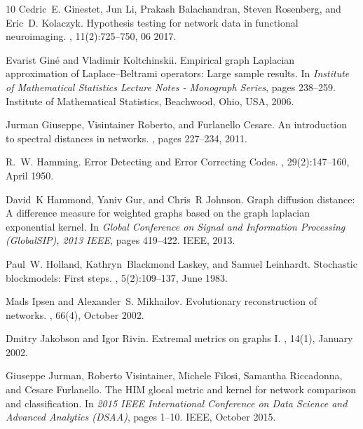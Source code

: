 \documentclass{amsart}
\begin{document}
\begin{thebibliography}{10}
Cedric~E. Ginestet, Jun Li, Prakash Balachandran, Steven Rosenberg, and Eric~D.
  Kolaczyk.
\newblock Hypothesis testing for network data in functional neuroimaging.
, 11(2):725--750, 06 2017.

Evarist Giné and Vladimir Koltchinskii.
\newblock Empirical graph {Laplacian} approximation of {Laplace}–{Beltrami}
  operators: {Large} sample results.
\newblock In {\em Institute of {Mathematical} {Statistics} {Lecture} {Notes} -
  {Monograph} {Series}}, pages 238--259. Institute of Mathematical Statistics,
  Beachwood, Ohio, USA, 2006.

Jurman Giuseppe, Visintainer Roberto, and Furlanello Cesare.
\newblock An introduction to spectral distances in networks.
, pages
  227--234, 2011.

R.~W. Hamming.
\newblock Error {Detecting} and {Error} {Correcting} {Codes}.
, 29(2):147--160, April 1950.

David~K Hammond, Yaniv Gur, and Chris~R Johnson.
\newblock Graph diffusion distance: A difference measure for weighted graphs
  based on the graph laplacian exponential kernel.
\newblock In {\em Global Conference on Signal and Information Processing
  (GlobalSIP), 2013 IEEE}, pages 419--422. IEEE, 2013.

Paul~W. Holland, Kathryn~Blackmond Laskey, and Samuel Leinhardt.
\newblock Stochastic blockmodels: {First} steps.
, 5(2):109--137, June 1983.

Mads Ipsen and Alexander~S. Mikhailov.
\newblock Evolutionary reconstruction of networks.
, 66(4), October 2002.

Dmitry Jakobson and Igor Rivin.
\newblock Extremal metrics on graphs {I}.
, 14(1), January 2002.

Giuseppe Jurman, Roberto Visintainer, Michele Filosi, Samantha Riccadonna, and
  Cesare Furlanello.
\newblock The {HIM} glocal metric and kernel for network comparison and
  classification.
\newblock In {\em 2015 {IEEE} {International} {Conference} on {Data} {Science}
  and {Advanced} {Analytics} ({DSAA})}, pages 1--10. IEEE, October 2015.


\end{thebibliography}
\end{document}
